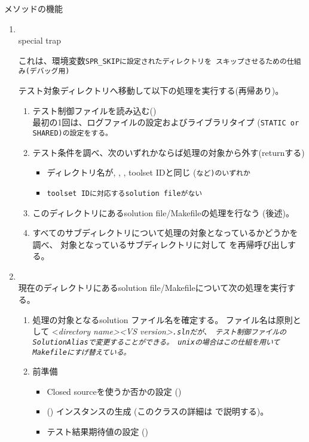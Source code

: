 \medskip
\begin{Description}{メソッドの機能}
\begin{enumerate}
  \item	{}\\
	special trap
	\begin{narrow}[20pt]
		これは、環境変数\tt{SPR\_SKIP}に設定されたディレクトリを
		スキップさせるための仕組み(デバッグ用)
	\end{narrow}
	テスト対象ディレクトリへ移動して以下の処理を実行する(再帰あり)。
	\begin{enumerate}
	  \item	テスト制御ファイルを読み込む()\\
		最初の1回は、ログファイルの設定およびライブラリタイプ
		(\tt{STATIC} or \tt{SHARED})の設定をする。

	  \item	テスト条件を調べ、次のいずれかならば処理の対象から外す(returnする)
		\begin{itemize}
		  \item	ディレクトリ名が, ,
			, toolset IDと同じ
			(\tt{}など)のいずれか
		  \item	\tt{toolset ID}に対応するsolution fileがない
		\end{itemize}

	  \item	このディレクトリにあるsolution file/Makefileの処理を行なう
		(後述)。

	  \item	すべてのサブディレクトリについて処理の対象となっているかどうかを調べ、
		対象となっているサブディレクトリに対して
		を再帰呼び出しする。
	\end{enumerate}

  \item	{}\\
	現在のディレクトリにあるsolution file/Makefileについて次の処理を実行する。
	\begin{enumerate}
	  \item	処理の対象となるsolution ファイル名を確定する。
		ファイル名は原則として
		\UpDQs <\it{directory name}><\it{VS version}>\tt{.sln}\UpDQe だが、
		テスト制御ファイルの\tt{SolutionAlias}で変更することができる。
		unixの場合はこの仕組を用いて\tt{Makefile}にすげ替えている。

	  \item	前準備
		\begin{itemize}
		  \item	Closed sourceを使うか否かの設定
			()
		  \item	{}
			()
			インスタンスの生成 (このクラスの詳細は
			で説明する)。
		  \item	テスト結果期待値の設定 ()
		\end{itemize}


\end{enumerate}
\end{enumerate}
\end{Description}
